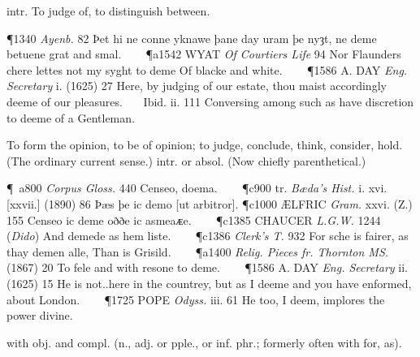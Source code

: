 \begin{description}[wide, labelwidth=!, labelindent=0pt]
\begin{myenumerate}
 intr. To judge of, to distinguish between.

\P 1340  \textit{Ayenb.} 82 Þet hi ne conne yknawe þane day uram þe nyȝt, ne deme betuene grat and smal.    
\P a1542 WYAT  \textit{Of Courtiers Life} 94 Nor Flaunders chere lettes not my syght to deme Of blacke and white.    
\P 1586 A. DAY  \textit{Eng. Secretary} i. (1625) 27 Here, by judging of our estate, thou maist accordingly deeme of our pleasures.    Ibid. ii. 111 Conversing among such as have discretion to deeme of a Gentleman.

 To form the opinion, to be of opinion; to judge, conclude, think, consider, hold. (The ordinary current sense.)  intr. or absol. (Now chiefly parenthetical.)

\P a800 \textit{Corpus Gloss.} 440 Censeo, doema.    
\P c900 tr. \textit{Bæda's Hist.} i. xvi. [xxvii.] (1890) 86 Þæs þe ic demo [ut arbitror]. 
\P c1000 ÆLFRIC  \textit{Gram.} xxvi. (Z.) 155 Censeo ic deme oððe ic asmeaᴁe.    
\P c1385 CHAUCER \textit{L.G.W.} 1244 (\textit{Dido}) And demede as hem liste.    
\P c1386  \textit{ Clerk's T.} 932 For sche is fairer, as thay demen alle, Than is Grisild.    
\P a1400 \textit{Relig.  Pieces fr. Thornton MS.} (1867) 20 To fele and with resone to deme.    
\P 1586 A. DAY  \textit{Eng. Secretary} ii. (1625) 15 He is not..here in the countrey, but as I deeme and you have enformed, about London.    
\P 1725 POPE  \textit{Odyss.} iii. 61 He too, I deem, implores the power divine.

 with obj. and compl. (n., adj. or pple., or inf. phr.; formerly often with for, as).


\end{myenumerate}
\end{description}
